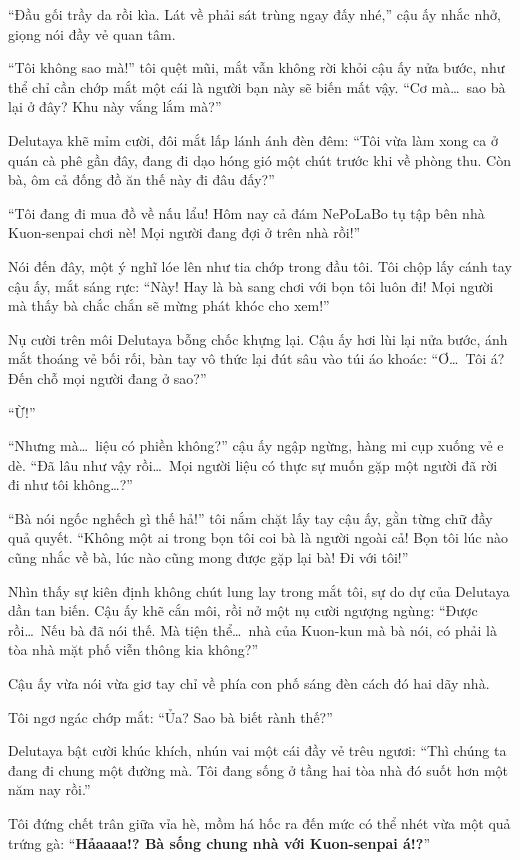 \documentclass[../main.tex]{subfiles}
\begin{document}
``Đầu gối trầy da rồi kìa. Lát về phải sát trùng ngay đấy nhé,'' cậu ấy nhắc nhở, giọng nói đầy vẻ quan tâm.

``Tôi không sao mà!'' tôi quệt mũi, mắt vẫn không rời khỏi cậu ấy nửa bước, như thể chỉ cần chớp mắt một cái là người bạn này sẽ biến mất vậy. ``Cơ mà\dots\ sao bà lại ở đây? Khu này vắng lắm mà?''

Delutaya khẽ mỉm cười, đôi mắt lấp lánh ánh đèn đêm: ``Tôi vừa làm xong ca ở quán cà phê gần đây, đang đi dạo hóng gió một chút trước khi về phòng thu. Còn bà, ôm cả đống đồ ăn thế này đi đâu đấy?''

``Tôi đang đi mua đồ về nấu lẩu! Hôm nay cả đám NePoLaBo tụ tập bên nhà Kuon-senpai chơi nè! Mọi người đang đợi ở trên nhà rồi!''

Nói đến đây, một ý nghĩ lóe lên như tia chớp trong đầu tôi. Tôi chộp lấy cánh tay cậu ấy, mắt sáng rực: ``Này! Hay là bà sang chơi với bọn tôi luôn đi! Mọi người mà thấy bà chắc chắn sẽ mừng phát khóc cho xem!''

Nụ cười trên môi Delutaya bỗng chốc khựng lại. Cậu ấy hơi lùi lại nửa bước, ánh mắt thoáng vẻ bối rối, bàn tay vô thức lại đút sâu vào túi áo khoác: ``Ơ\dots\ Tôi á? Đến chỗ mọi người đang ở sao?''

``Ừ!''

``Nhưng mà\dots\ liệu có phiền không?'' cậu ấy ngập ngừng, hàng mi cụp xuống vẻ e dè. ``Đã lâu như vậy rồi\dots\ Mọi người liệu có thực sự muốn gặp một người đã rời đi như tôi không\dots?''

``Bà nói ngốc nghếch gì thế hả!'' tôi nắm chặt lấy tay cậu ấy, gằn từng chữ đầy quả quyết. ``Không một ai trong bọn tôi coi bà là người ngoài cả! Bọn tôi lúc nào cũng nhắc về bà, lúc nào cũng mong được gặp lại bà! Đi với tôi!''

Nhìn thấy sự kiên định không chút lung lay trong mắt tôi, sự do dự của Delutaya dần tan biến. Cậu ấy khẽ cắn môi, rồi nở một nụ cười ngượng ngùng: ``Được rồi\dots\ Nếu bà đã nói thế. Mà tiện thể\dots\ nhà của Kuon-kun mà bà nói, có phải là tòa nhà mặt phố viễn thông kia không?''

Cậu ấy vừa nói vừa giơ tay chỉ về phía con phố sáng đèn cách đó hai dãy nhà.

Tôi ngơ ngác chớp mắt: ``Ủa? Sao bà biết rành thế?''

Delutaya bật cười khúc khích, nhún vai một cái đầy vẻ trêu ngươi: ``Thì chúng ta đang đi chung một đường mà. Tôi đang sống ở tầng hai tòa nhà đó suốt hơn một năm nay rồi.''

Tôi đứng chết trân giữa vỉa hè, mồm há hốc ra đến mức có thể nhét vừa một quả trứng gà: ``\textbf{Hảaaaa!? Bà sống chung nhà với Kuon-senpai á!?}''
\end{document}
